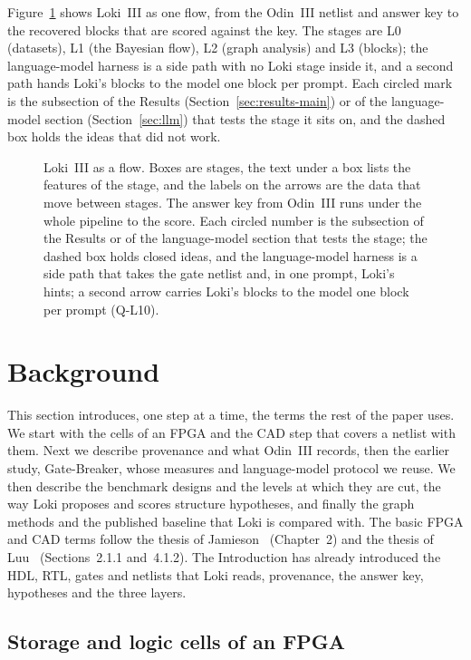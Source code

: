 \documentclass[conference]{IEEEtran}
\begin{document}
Figure~\ref{fig:flow} shows Loki~III as one flow, from the Odin~III netlist and answer key to the recovered blocks that are scored against the key. The stages are L0 (datasets), L1 (the Bayesian flow), L2 (graph analysis) and L3 (blocks); the language-model harness is a side path with no Loki stage inside it, and a second path hands Loki's blocks to the model one block per prompt. Each circled mark is the subsection of the Results (Section~\ref{sec:results-main}) or of the language-model section (Section~\ref{sec:llm}) that tests the stage it sits on, and the dashed box holds the ideas that did not work.

\begin{figure}[tp]
\centering
\odinfit{\textwidth}{}
\caption{Loki~III as a flow. Boxes are stages, the text under a box lists the features of the stage, and the labels on the arrows are the data that move between stages. The answer key from Odin~III runs under the whole pipeline to the score. Each circled number is the subsection of the Results or of the language-model section that tests the stage; the dashed box holds closed ideas, and the language-model harness is a side path that takes the gate netlist and, in one prompt, Loki's hints; a second arrow carries Loki's blocks to the model one block per prompt (Q-L10).}
\label{fig:flow}
\end{figure}


\section{Background}
\label{sec:background}

This section introduces, one step at a time, the terms the rest of the paper uses. We start with
the cells of an FPGA and the CAD step that covers a netlist with them. Next we describe
provenance and what Odin~III records, then the earlier study, Gate-Breaker, whose measures and
language-model protocol we reuse. We then describe the benchmark designs and the levels at which they are cut,
the way Loki proposes and scores structure hypotheses, and finally the graph methods and the published
baseline that Loki is compared with. The basic FPGA and CAD terms follow the thesis of
Jamieson~\cite{jamiesonthesis} (Chapter~2) and the thesis of Luu~\cite{luuthesis}
(Sections~2.1.1 and~4.1.2). The Introduction has already introduced the HDL, RTL, gates and netlists
that Loki reads, provenance, the answer key, hypotheses and the three layers.

\subsection{Storage and logic cells of an FPGA}
\end{document}

